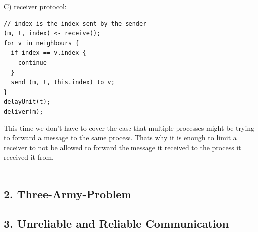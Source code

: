 \documentclass{article}
\begin{document}
C) receiver protocol:
\begin{lstlisting}[style=CStyle]
// index is the index sent by the sender
(m, t, index) <- receive();
for v in neighbours {
  if index == v.index {
    continue
  }
  send (m, t, this.index) to v;
}
delayUnit(t);
deliver(m);
\end{lstlisting}
This time we don't have to cover the case that multiple processes might be trying to forward a message to
the same process. Thats why it is enough to limit a receiver to not be allowed to forward the message it 
received to the process it received it from.\\
\\
\subsection*{2. Three-Army-Problem}


\subsection*{3. Unreliable and Reliable Communication}
\end{document}
